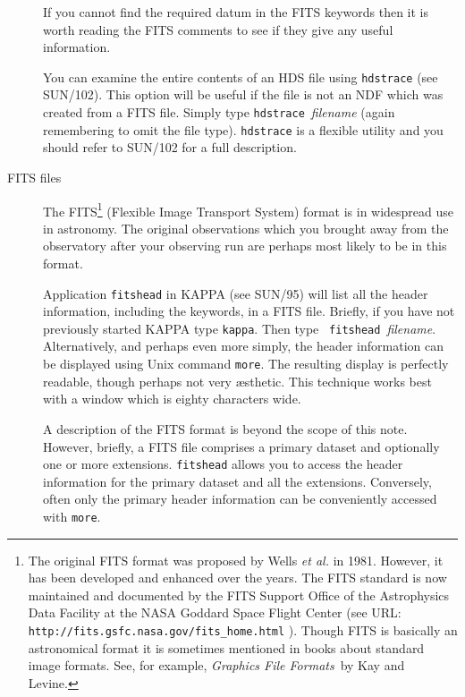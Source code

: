 \documentclass[twoside,11pt]{article}
\newcommand{\htmladdnormallink}[2]{#1}
\newcommand{\xref}[3]{#1}
\begin{document}
\begin{description}
   If you cannot find the required datum in the FITS keywords then it
   is worth reading the FITS comments to see if they give any useful
   information.

   You can examine the entire contents of an HDS file using {\tt hdstrace}
   (see \xref{SUN/102}{sun102}{}\cite{SUN102}).  This option will be
   useful if the file is not an NDF which was created from a
   FITS file.  Simply type 
   \xref{{\tt hdstrace}}{sun102}{HDSTRACE}~{\it filename} (again
   remembering to omit the file type).  {\tt hdstrace} is a flexible
   utility and you should refer to SUN/102 for a full description.

  \item[FITS files] The FITS\footnote{The original FITS format was
   proposed by Wells {\it et al.}\/\cite{WELLS81} in 1981.  However, it
   has been developed and enhanced over the years.  The FITS
   standard is now maintained and documented by the FITS Support Office
   of the Astrophysics Data Facility at the NASA Goddard Space Flight
   Center (see URL: \htmladdnormallink{ {\tt
   http://fits.gsfc.nasa.gov/fits\_home.html} }
   {http://fits.gsfc.nasa.gov/fits_home.html}).
   Though FITS is basically an astronomical format it is sometimes
   mentioned in books about standard image formats.  See, for example,
   {\it Graphics File Formats}\, by Kay and Levine\cite{KAY95}.} (Flexible
   Image Transport System) format is in widespread use in astronomy.  The
   original observations which you brought away from the observatory after
   your observing run are perhaps most likely to be in this format.

   Application \xref{{\tt fitshead}}{sun95}{FITSHEAD} in KAPPA (see
   \xref{SUN/95}{sun95}{}\cite{SUN95}) will list all the header
   information, including the keywords, in a FITS file.  Briefly, if you
   have not previously started KAPPA type {\tt kappa}.  Then type {\tt
   fitshead}~{\it filename}.  Alternatively, and perhaps even more
   simply, the header information can be displayed using Unix command
   {\tt more}.  The resulting display is perfectly readable, though
   perhaps not very \ae sthetic.  This technique works best with a
   window which is eighty characters wide.

   A description of the FITS format is beyond the scope of this note.
   However, briefly, a FITS file comprises a primary dataset and
   optionally one or more extensions.  {\tt fitshead} allows you to access
   the header information for the primary dataset and all the
   extensions.  Conversely, often only the primary header information
   can be conveniently accessed with {\tt more}.


\end{description}
\end{document}
